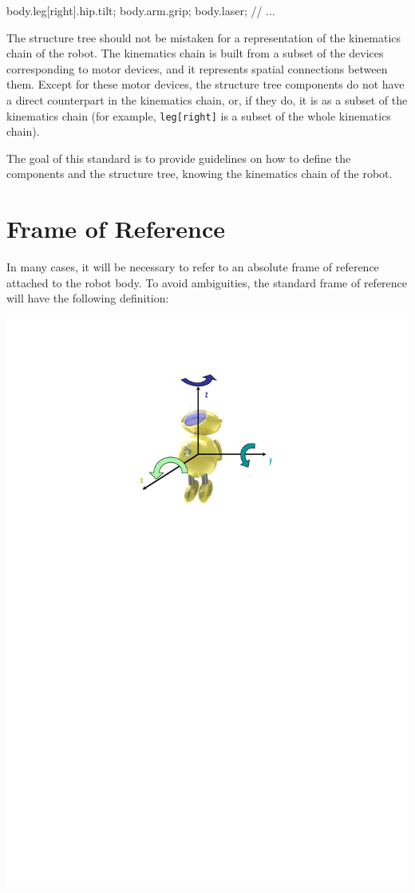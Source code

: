 \begin{urbiunchecked}
body.leg[right].hip.tilt;
body.arm.grip;
body.laser;
// ...
\end{urbiunchecked}


The structure tree should not be mistaken for a representation of the
kinematics chain of the robot. The kinematics chain is built from a subset
of the devices corresponding to motor devices, and it represents spatial
connections between them. Except for these motor devices, the structure tree
components do not have a direct counterpart in the kinematics chain, or, if
they do, it is as a subset of the kinematics chain (for example,
\lstinline{leg[right]} is a subset of the whole kinematics chain).


The goal of this standard is to provide guidelines on how to define
the components and the structure tree, knowing the kinematics chain of
the robot.

\section{Frame of Reference}

In many cases, it will be necessary to refer to an absolute frame of
reference attached to the robot body. To avoid ambiguities, the
standard frame of reference will have the following definition:

\begin{center}
  \includegraphics{img/reference-frame}
\end{center}

